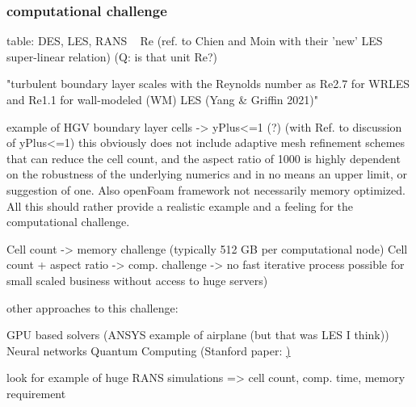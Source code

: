 \subsubsection{computational challenge}
\label{chap:chap_0X_CompuChallenges}

table: DES, LES, RANS ~ Re (ref. to Chien and Moin with their 'new' LES super-linear relation) (Q: is that unit Re?)

"turbulent boundary layer
scales with the Reynolds number as Re2.7
for WRLES and Re1.1
for wall-modeled (WM)
LES (Yang \& Griffin 2021)"

example of HGV boundary layer cells -> yPlus<=1 (?) (with Ref. to discussion of yPlus<=1)
	this obviously does not include adaptive mesh refinement schemes that can reduce the cell count, and the aspect ratio of 1000 is highly dependent on the robustness of the 	underlying numerics and in no means an upper limit, or suggestion of one. Also openFoam framework not necessarily memory optimized. All this should rather provide a realistic example and a feeling for the computational challenge.

Cell count -> memory challenge (typically 512 GB per computational node)
Cell count + aspect ratio -> comp. challenge -> no fast iterative process possible for small scaled business without access to huge servers)

other approaches to this challenge:

GPU based solvers (ANSYS example of airplane (but that was LES I think))
Neural networks
Quantum Computing (Stanford paper: \href{https://web.stanford.edu/group/ctr/ResBriefs/2019/27_Griffin.pdf})

look for example of huge RANS simulations => cell count, comp. time, memory requirement

